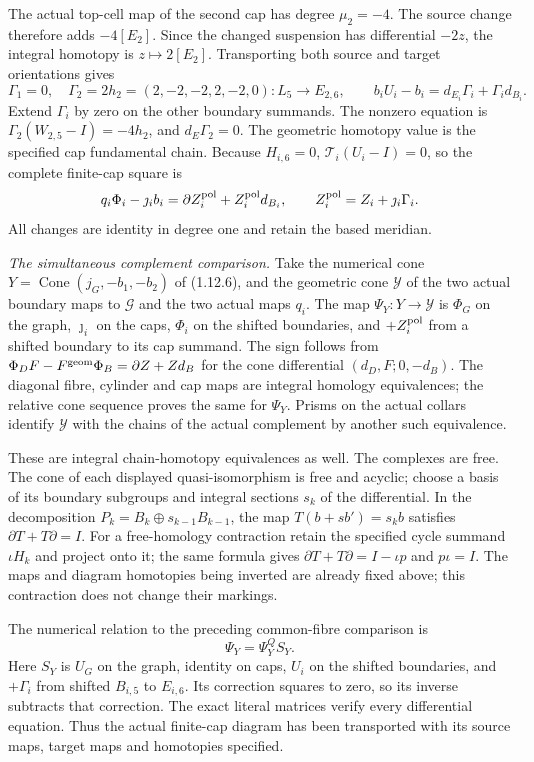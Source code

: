 The actual top-cell map of the second cap has degree $\mu_2=-4$.
The source change therefore adds $-4[E_2]$. Since the changed
suspension has differential $-2z$, the integral homotopy is
$z\mapsto2[E_2]$. Transporting both source and target orientations
gives
\[
 \Gamma_1=0,\quad
 \Gamma_2=2h_2=(2,-2,-2,2,-2,0):L_5\longrightarrow E_{2,6},
 \qquad b_iU_i-b_i=d_{E_i}\Gamma_i+\Gamma_i d_{B_i}.
\]
Extend $\Gamma_i$ by zero on the other boundary summands. The
nonzero equation is $\Gamma_2(W_{2,5}-I)=-4h_2$, and
$d_E\Gamma_2=0$. The geometric homotopy value is the specified cap
fundamental chain. Because $H_{i,6}=0$,
$\mathcal T_i(U_i-I)=0$, so the complete finite-cap square is
\[
 q_i\Phi_i-\jmath_i b_i
  =\partial Z_i^{\rm pol}+Z_i^{\rm pol}d_{B_i},\qquad
 Z_i^{\rm pol}=Z_i+\jmath_i\Gamma_i.
\]
All changes are identity in degree one and retain the based meridian.

\item \emph{The simultaneous complement comparison.}
Take the numerical cone $Y=\operatorname{Cone}(j_G,-b_1,-b_2)$
of (1.12.6), and the geometric cone $\mathcal Y$ of the two actual
boundary maps to $\mathcal G$ and the two actual maps $q_i$.
The map $\Psi_Y:Y\to\mathcal Y$ is $\Phi_G$ on the graph,
$\jmath_i$ on the caps, $\Phi_i$ on the shifted boundaries, and
$+Z_i^{\rm pol}$ from a shifted boundary to its cap summand.
The sign follows from
$\Phi_DF-F^{\rm geom}\Phi_B=\partial Z+Zd_B$
for the cone differential $(d_D,F;0,-d_B)$.
The diagonal fibre, cylinder and cap maps are integral homology
equivalences; the relative cone sequence proves the same for
$\Psi_Y$. Prisms on the actual collars identify $\mathcal Y$ with
the chains of the actual complement by another such equivalence.

These are integral chain-homotopy equivalences as well. The complexes
are free. The cone of each displayed quasi-isomorphism is free and
acyclic; choose a basis of its boundary subgroups and integral
sections $s_k$ of the differential. In the decomposition
$P_k=B_k\oplus s_{k-1}B_{k-1}$, the map
$T(b+s b')=s_kb$ satisfies $\partial T+T\partial=I$.
For a free-homology contraction retain the specified cycle summand
$\iota H_k$ and project onto it; the same formula gives
$\partial T+T\partial=I-\iota p$ and $p\iota=I$.
The maps and diagram homotopies being inverted are already fixed
above; this contraction does not change their markings.

The numerical relation to the preceding common-fibre comparison is
\[
 \Psi_Y=\Psi_Y^Q S_Y.
\]
Here $S_Y$ is $U_G$ on the graph, identity on caps, $U_i$ on the
shifted boundaries, and $+\Gamma_i$ from shifted $B_{i,5}$ to
$E_{i,6}$. Its correction squares to zero, so its inverse subtracts
that correction. The exact literal matrices verify every
differential equation. Thus the actual finite-cap diagram has been
transported with its source maps, target maps and homotopies specified.

